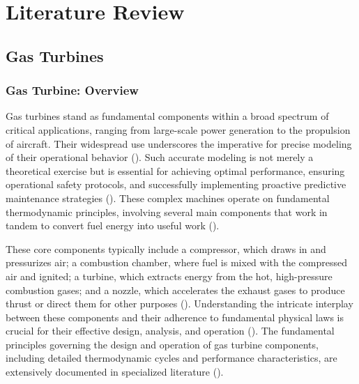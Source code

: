 \documentclass[
  12pt,
  oneside,
  a4paper,
  english,
  brazil]{abntex2}
\begin{document}
\chapter{\textbf{Literature Review}}

\section{\texorpdfstring{\textbf{Gas Turbines}}{}}\label{section-2}

\subsection{Gas Turbine: Overview}\label{gas-turbine-overview}

Gas turbines stand as fundamental components within a broad spectrum of
critical applications, ranging from large-scale power generation to the
propulsion of aircraft. Their widespread use underscores the imperative
for precise modeling of their operational behavior
(). Such accurate
modeling is not merely a theoretical exercise but is essential for
achieving optimal performance, ensuring operational safety protocols,
and successfully implementing proactive predictive maintenance
strategies (). These
complex machines operate on fundamental thermodynamic principles,
involving several main components that work in tandem to convert fuel
energy into useful work ().

These core components typically include a compressor, which draws in and
pressurizes air; a combustion chamber, where fuel is mixed with the
compressed air and ignited; a turbine, which extracts energy from the
hot, high-pressure combustion gases; and a nozzle, which accelerates the
exhaust gases to produce thrust or direct them for other purposes
(). Understanding the intricate interplay between these components
and their adherence to fundamental physical laws is crucial for their
effective design, analysis, and operation
(). The fundamental principles governing the design and operation of
gas turbine components, including detailed thermodynamic cycles and
performance characteristics, are extensively documented in specialized
literature ().
\end{document}
